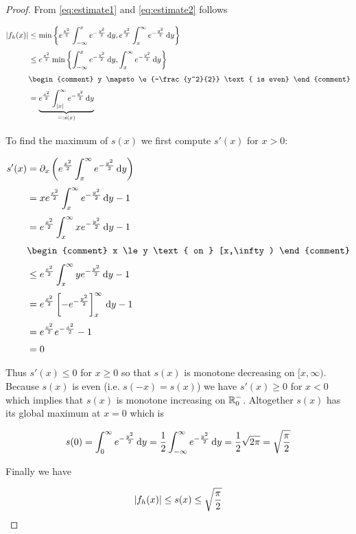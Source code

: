\begin{proof}
  \noindent From \eqref{eq:estimate1} and \eqref{eq:estimate2} follows

  \begin{align}
    \abs{f_h(x)} & \le \min\left\{ \e{\frac{x^2}{2}} \int_{-\infty}^x \e{-\frac{y^2}{2}} \d{y}, \e{\frac{x^2}{2}} \int_x^\infty \e{-\frac{y^2}{2}} \d{y} \right\} \nl
    & \le \e{\frac{x^2}{2}} \min\left\{ \int_{-\infty}^x \e{-\frac{y^2}{2}} \d{y}, \int_x^\infty \e{-\frac{y^2}{2}} \d{y} \right\} \nl
    &
    \begin{comment}
      y \mapsto \e{-\frac{y^2}{2}} \text{ is even}
    \end{comment} \nl
    & = \underbrace{\e{\frac{x^2}{2}} \int_{\abs{x}}^\infty \e{-\frac{y^2}{2}} \d{y}}_{=: s(x)} \nl
  \end{align}

  \noindent To find the maximum of $s(x)$ we first compute $s'(x)$ for $x > 0$:

  \begin{align}
    s'(x) &= \partial_x \left( \e{\frac{x^2}{2}} \int_x^\infty \e{-\frac{y^2}{2}} \d{y} \right) \nl
    &= x\e{\frac{x^2}{2}} \int_x^\infty \e{-\frac{y^2}{2}} \d{y} - 1 \nl
    &= \e{\frac{x^2}{2}} \int_x^\infty x\e{-\frac{y^2}{2}} \d{y} - 1 \nl
    &
    \begin{comment}
      x \le y \text{ on } [x,\infty)
    \end{comment} \nl
    &\le \e{\frac{x^2}{2}} \int_x^\infty y\e{-\frac{y^2}{2}} \d{y} - 1 \nl
    &= \e{\frac{x^2}{2}} \left[-\e{-\frac{y^2}{2}}\right]_x^\infty \d{y} - 1 \nl
    &= \e{\frac{x^2}{2}} \e{-\frac{x^2}{2}} - 1 \nl
    &= 0
  \end{align}

  Thus $s'(x) \le 0$ for $x \ge 0$ so that $s(x)$ is monotone decreasing on $[x,\infty)$. Because $s(x)$ is even (i.e. $s(-x)=s(x)$) we have $s'(x) \ge 0$ for $x < 0$ which implies that $s(x)$ is monotone increasing on $\mathbb R^{-}_0$. Altogether $s(x)$ has its global maximum at $x=0$ which is

  \begin{align}
    s(0) = \int_0^\infty e^{-\frac{y^2}{2}} \,\mathrm d{y} = \frac{1}{2} \int_{-\infty}^\infty e^{-\frac{y^2}{2}} \,\mathrm d{y} = \frac{1}{2} \sqrt{2\pi} = \sqrt{\frac{\pi}{2}}
  \end{align}

  \noindent Finally we have

  \begin{align}
    \left|{f_h(x)}\right| \le s(x) \le \sqrt{\frac \pi 2}
  \end{align}


\end{proof}
